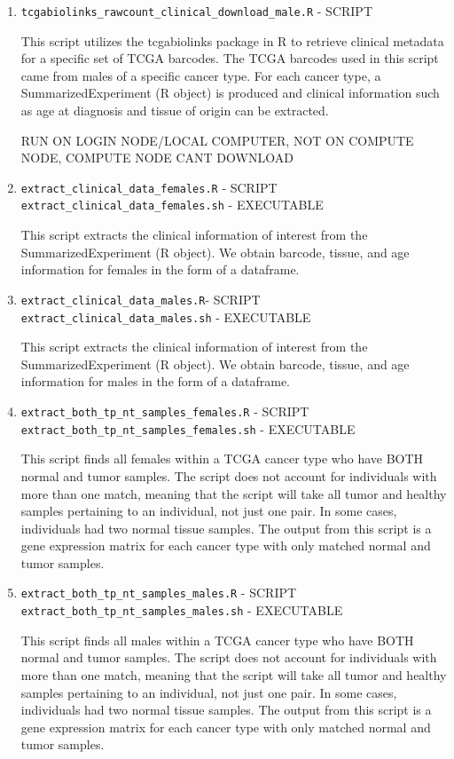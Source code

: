 \documentclass[10pt]{article}
\begin{document}
\begin{enumerate}
\item\texttt{tcgabiolinks\_rawcount\_clinical\_download\_male.R} - SCRIPT

This script utilizes the tcgabiolinks package in R to retrieve clinical metadata for a specific set of TCGA barcodes. The TCGA barcodes used in this script came from males of a specific cancer type. For each cancer type, a SummarizedExperiment (R object) is produced and clinical information such as age at diagnosis and tissue of origin can be extracted.

RUN ON LOGIN NODE/LOCAL COMPUTER, NOT ON COMPUTE NODE, COMPUTE NODE CANT DOWNLOAD
\item\texttt{extract\_clinical\_data\_females.R} - SCRIPT\newline
\texttt{extract\_clinical\_data\_females.sh} - EXECUTABLE

This script extracts the clinical information of interest from the SummarizedExperiment (R object). We obtain barcode, tissue, and age information for females in the form of a dataframe.

\item\texttt{extract\_clinical\_data\_males.R}- SCRIPT\newline
\texttt{extract\_clinical\_data\_males.sh} - EXECUTABLE

This script extracts the clinical information of interest from the SummarizedExperiment (R object). We obtain barcode, tissue, and age information for males in the form of a dataframe.

\item\texttt{extract\_both\_tp\_nt\_samples\_females.R} - SCRIPT \newline
\texttt{extract\_both\_tp\_nt\_samples\_females.sh} - EXECUTABLE

This script finds all females within a TCGA cancer type who have BOTH normal and tumor samples. The script does not account for individuals with more than one match, meaning that the script will take all tumor and healthy samples pertaining to an individual, not just one pair. In some cases, individuals had two normal tissue samples. The output from this script is a gene expression matrix for each cancer type with only matched normal and tumor samples.

\item\texttt{extract\_both\_tp\_nt\_samples\_males.R} - SCRIPT \newline
\texttt{extract\_both\_tp\_nt\_samples\_males.sh} - EXECUTABLE

This script finds all males within a TCGA cancer type who have BOTH normal and tumor samples. The script does not account for individuals with more than one match, meaning that the script will take all tumor and healthy samples pertaining to an individual, not just one pair. In some cases, individuals had two normal tissue samples. The output from this script is a gene expression matrix for each cancer type with only matched normal and tumor samples.


\end{enumerate}
\end{document}
